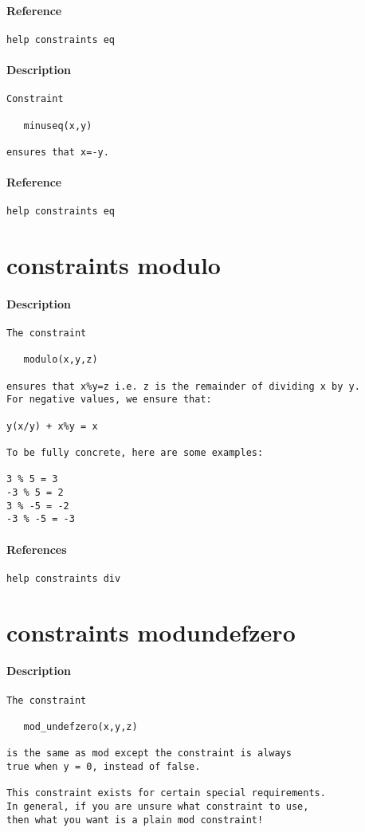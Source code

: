 \paragraph{Reference}
{\footnotesize
\begin{verbatim}
help constraints eq
\end{verbatim}
}
\paragraph{Description}
{\footnotesize
\begin{verbatim}
Constraint

   minuseq(x,y)

ensures that x=-y.
\end{verbatim}
}
\paragraph{Reference}
{\footnotesize
\begin{verbatim}
help constraints eq
\end{verbatim}
}
\section{constraints modulo}
\paragraph{Description}
{\footnotesize
\begin{verbatim}
The constraint
 
   modulo(x,y,z)

ensures that x%y=z i.e. z is the remainder of dividing x by y.
For negative values, we ensure that:

y(x/y) + x%y = x

To be fully concrete, here are some examples:

3 % 5 = 3
-3 % 5 = 2
3 % -5 = -2
-3 % -5 = -3
\end{verbatim}
}
\paragraph{References}
{\footnotesize
\begin{verbatim}
help constraints div
\end{verbatim}
}
\section{constraints mod\textunderscore undefzero}
\paragraph{Description}
{\footnotesize
\begin{verbatim}
The constraint
 
   mod_undefzero(x,y,z)

is the same as mod except the constraint is always 
true when y = 0, instead of false.

This constraint exists for certain special requirements.
In general, if you are unsure what constraint to use,
then what you want is a plain mod constraint!
\end{verbatim}
}
